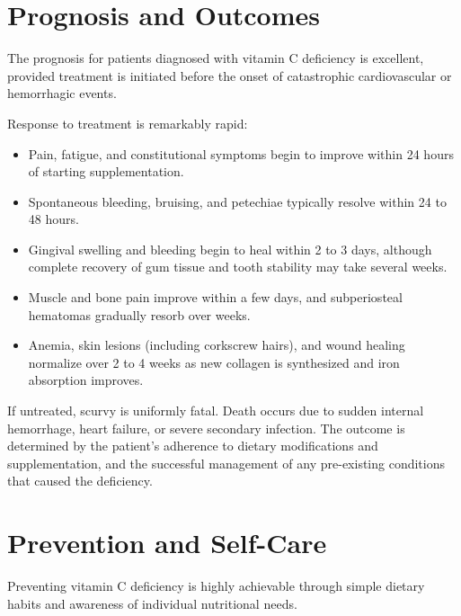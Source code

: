 \section*{Prognosis and Outcomes}
The prognosis for patients diagnosed with vitamin C deficiency is excellent, provided treatment is initiated before the onset of catastrophic cardiovascular or hemorrhagic events.

Response to treatment is remarkably rapid:
\begin{itemize}
    \item Pain, fatigue, and constitutional symptoms begin to improve within 24 hours of starting supplementation.
    \item Spontaneous bleeding, bruising, and petechiae typically resolve within 24 to 48 hours.
    \item Gingival swelling and bleeding begin to heal within 2 to 3 days, although complete recovery of gum tissue and tooth stability may take several weeks.
    \item Muscle and bone pain improve within a few days, and subperiosteal hematomas gradually resorb over weeks.
    \item Anemia, skin lesions (including corkscrew hairs), and wound healing normalize over 2 to 4 weeks as new collagen is synthesized and iron absorption improves.
\end{itemize}

If untreated, scurvy is uniformly fatal. Death occurs due to sudden internal hemorrhage, heart failure, or severe secondary infection. The outcome is determined by the patient's adherence to dietary modifications and supplementation, and the successful management of any pre-existing conditions that caused the deficiency.

\section*{Prevention and Self-Care}
Preventing vitamin C deficiency is highly achievable through simple dietary habits and awareness of individual nutritional needs.

